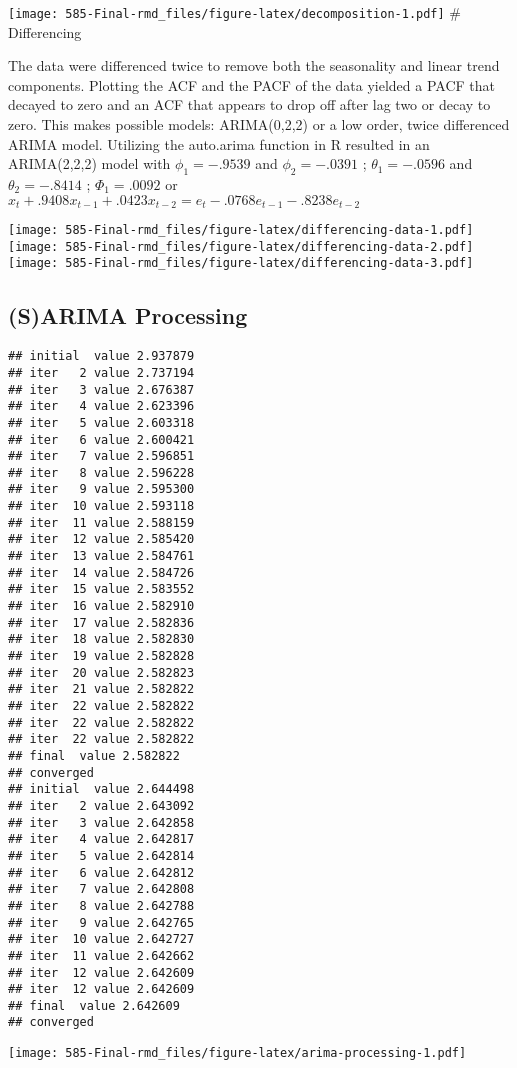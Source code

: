 \documentclass[
]{article}
\begin{document}
\texttt{[image: 585-Final-rmd\_files/figure-latex/decomposition-1.pdf]}
\# Differencing

The data were differenced twice to remove both the seasonality and
linear trend components. Plotting the ACF and the PACF of the data
yielded a PACF that decayed to zero and an ACF that appears to drop off
after lag two or decay to zero. This makes possible models: ARIMA(0,2,2)
or a low order, twice differenced ARIMA model. Utilizing the auto.arima
function in R resulted in an ARIMA(2,2,2) model with \(\phi_1= -.9539\)
and \(\phi_2=-.0391\) ; \(\theta_1= -.0596\) and \(\theta_2=-.8414\) ;
\(\Phi_1 = .0092\) or
\(x_t+.9408x_{t-1}+.0423x_{t-2}=e_t-.0768e_{t-1}-.8238e_{t-2}\)

\texttt{[image: 585-Final-rmd\_files/figure-latex/differencing-data-1.pdf]}
\texttt{[image: 585-Final-rmd\_files/figure-latex/differencing-data-2.pdf]}
\texttt{[image: 585-Final-rmd\_files/figure-latex/differencing-data-3.pdf]}

\hypertarget{sarima-processing}{%
\subsection{(S)ARIMA Processing}\label{sarima-processing}}

\begin{verbatim}
## initial  value 2.937879 
## iter   2 value 2.737194
## iter   3 value 2.676387
## iter   4 value 2.623396
## iter   5 value 2.603318
## iter   6 value 2.600421
## iter   7 value 2.596851
## iter   8 value 2.596228
## iter   9 value 2.595300
## iter  10 value 2.593118
## iter  11 value 2.588159
## iter  12 value 2.585420
## iter  13 value 2.584761
## iter  14 value 2.584726
## iter  15 value 2.583552
## iter  16 value 2.582910
## iter  17 value 2.582836
## iter  18 value 2.582830
## iter  19 value 2.582828
## iter  20 value 2.582823
## iter  21 value 2.582822
## iter  22 value 2.582822
## iter  22 value 2.582822
## iter  22 value 2.582822
## final  value 2.582822 
## converged
## initial  value 2.644498 
## iter   2 value 2.643092
## iter   3 value 2.642858
## iter   4 value 2.642817
## iter   5 value 2.642814
## iter   6 value 2.642812
## iter   7 value 2.642808
## iter   8 value 2.642788
## iter   9 value 2.642765
## iter  10 value 2.642727
## iter  11 value 2.642662
## iter  12 value 2.642609
## iter  12 value 2.642609
## final  value 2.642609 
## converged
\end{verbatim}

\texttt{[image: 585-Final-rmd\_files/figure-latex/arima-processing-1.pdf]}
\end{document}
